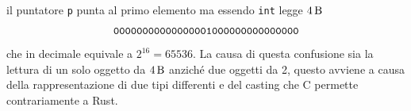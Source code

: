 \documentclass[Lau,binding=0.6cm]{sapthesis}
\newcommand{\textcode}[1]{\colorbox{backcolour}{\texttt{#1}}}
\begin{document}
il puntatore \texttt{p} punta al primo elemento ma essendo \textcode{int} legge $ \SI{4}{\byte} $  
\[
\texttt{00000000000000001000000000000000} \\
\]
che in decimale equivale a $ 2^{16} = 65536 $. La causa di questa confusione sia la lettura di un solo oggetto da $\SI{4}{\byte} $ anziché due oggetti da 2, questo avviene a causa della rappresentazione di due tipi differenti e del casting che C permette contrariamente a Rust.




%
%

\backmatter

\cleardoublepage
{}
{}
\end{document}
